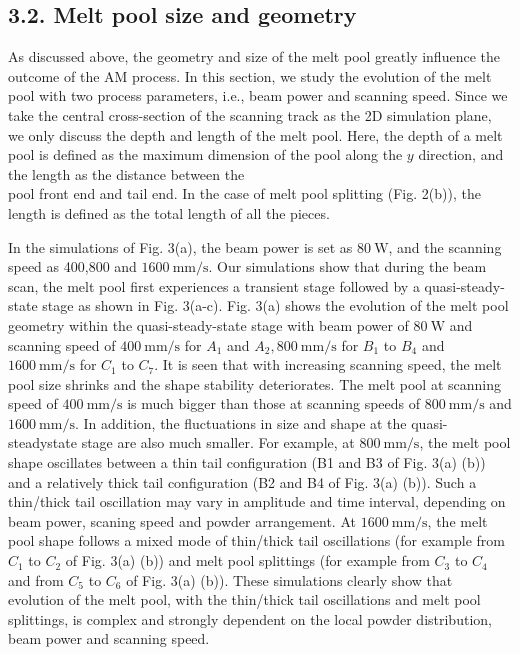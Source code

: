 \documentclass[10pt]{article}
\begin{document}
\subsection*{3.2. Melt pool size and geometry}
As discussed above, the geometry and size of the melt pool greatly influence the outcome of the AM process. In this section, we study the evolution of the melt pool with two process parameters, i.e., beam power and scanning speed. Since we take the central cross-section of the scanning track as the 2D simulation plane, we only discuss the depth and length of the melt pool. Here, the depth of a melt pool is defined as the maximum dimension of the pool along the $y$ direction, and the length as the distance between the\\
pool front end and tail end. In the case of melt pool splitting (Fig. 2(b)), the length is defined as the total length of all the pieces.

In the simulations of Fig. 3(a), the beam power is set as $80 \mathrm{~W}$, and the scanning speed as 400,800 and $1600 \mathrm{~mm} / \mathrm{s}$. Our simulations show that during the beam scan, the melt pool first experiences a transient stage followed by a quasi-steady-state stage as shown in Fig. 3(a-c). Fig. 3(a) shows the evolution of the melt pool geometry within the quasi-steady-state stage with beam power of $80 \mathrm{~W}$ and scanning speed of $400 \mathrm{~mm} / \mathrm{s}$ for $A_{1}$ and $A_{2}, 800 \mathrm{~mm} / \mathrm{s}$ for $B_{1}$ to $B_{4}$ and $1600 \mathrm{~mm} / \mathrm{s}$ for $C_{1}$ to $C_{7}$. It is seen that with increasing scanning speed, the melt pool size shrinks and the shape stability deteriorates. The melt pool at scanning speed of $400 \mathrm{~mm} / \mathrm{s}$ is much bigger than those at scanning speeds of $800 \mathrm{~mm} / \mathrm{s}$ and $1600 \mathrm{~mm} / \mathrm{s}$. In addition, the fluctuations in size and shape at the quasi-steadystate stage are also much smaller. For example, at $800 \mathrm{~mm} / \mathrm{s}$, the melt pool shape oscillates between a thin tail configuration (B1 and B3 of Fig. 3(a) (b)) and a relatively thick tail configuration (B2 and B4 of Fig. 3(a) (b)). Such a thin/thick tail oscillation may vary in amplitude and time interval, depending on beam power, scaning speed and powder arrangement. At $1600 \mathrm{~mm} / \mathrm{s}$, the melt pool shape follows a mixed mode of thin/thick tail oscillations (for example from $C_{1}$ to $C_{2}$ of Fig. 3(a) (b)) and melt pool splittings (for example from $C_{3}$ to $C_{4}$ and from $C_{5}$ to $C_{6}$ of Fig. 3(a) (b)). These simulations clearly show that evolution of the melt pool, with the thin/thick tail oscillations and melt pool splittings, is complex and strongly dependent on the local powder distribution, beam power and scanning speed.
\end{document}
